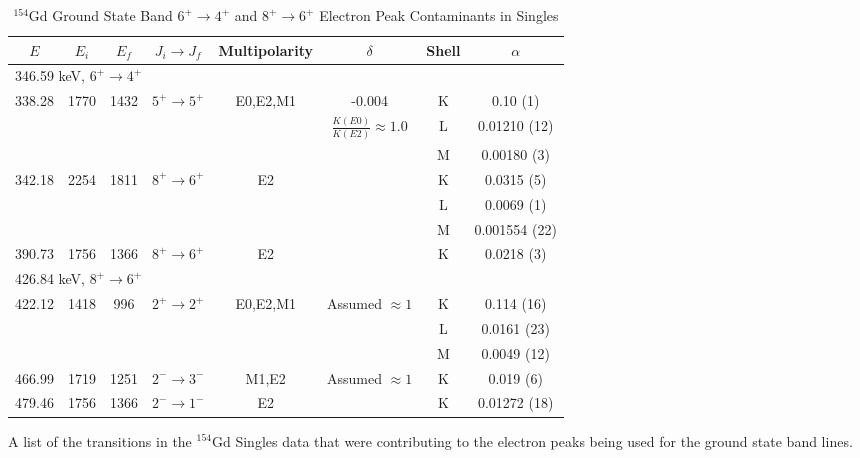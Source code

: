 \begin{table}[!]
    \centering
    \begin{longtable}{c|c|c|c|c|c|c|c}
        \caption{$^{154}$Gd Ground State Band $6^+\rightarrow 4^+$ and $8^+\rightarrow 6^+$ Electron Peak Contaminants in Singles}
        \label{tab:154Gd_Contaminants} \\
        \toprule
         $E$ & $E_i$ & $E_f$ & $J_i\rightarrow J_f$ & Multipolarity & $\delta$ & Shell & $\alpha$  \\ \hline
         \endhead
         \multicolumn{8}{l}{346.59 keV, $6^+\rightarrow 4^+$} \\ \hline
         338.28 & 1770 & 1432 & $5^+\rightarrow 5^+$ & E0,E2,M1 & -0.004 & K & 0.10 (1) \\ 
         & & & & & $\frac{K(E0)}{K(E2)}\approx 1.0$ & L & 0.01210 (12) \\ 
         & & & & & & M & 0.00180 (3) \\ \hline
         342.18 & 2254 & 1811 & $8^+\rightarrow 6^+$ & E2 & & K & 0.0315 (5) \\ 
         & & & & & & L & 0.0069 (1) \\\
         & & & & & & M & 0.001554 (22) \\ \hline
         390.73 & 1756 & 1366 & $8^+\rightarrow 6^+$ & E2 & & K & 0.0218 (3) \\ \hline
         \multicolumn{8}{l}{426.84 keV, $8^+\rightarrow 6^+$} \\ \hline
         422.12 & 1418 & 996 & $2^+\rightarrow 2^+$ & E0,E2,M1 & Assumed $\approx 1$ & K & 0.114 (16) \\ 
         & & & & & & L & 0.0161 (23) \\ 
         & & & & & & M & 0.0049 (12) \\ \hline
         466.99 & 1719 & 1251 & $2^-\rightarrow 3^-$ & M1,E2 & Assumed $\approx 1$ & K & 0.019 (6) \\ \hline
         479.46 & 1756 & 1366 & $2^-\rightarrow 1^-$ & E2 & & K & 0.01272 (18) \\
         \bottomrule
    \end{longtable}
    \item{A list of the transitions in the $^{154}$Gd Singles data that were contributing to the electron peaks being used for the ground state band lines.}
\end{table}